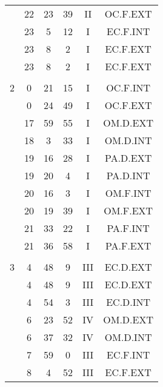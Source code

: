 \documentclass[12pt, a4paper]{article}
\begin{document}
\begin{multicols}{3}
{\begin{tabular}{c c c c c c}
	 	 	 	 & 22 & 23 & 39 & II & OC.F.EXT\\%
	 	 	 	 & 23 & 5 & 12 & I & EC.F.INT\\%
	 	 	 	 & 23 & 8 & 2 & I & EC.F.EXT\\%
	 	 	 	 & 23 & 8 & 2 & I & EC.F.EXT\\%
	 	 	 	 & & & & & \\%
	 	 	 	2 & 0 & 21 & 15 & I & OC.F.INT\\%
	 	 	 	 & 0 & 24 & 49 & I & OC.F.EXT\\%
	 	 	 	 & 17 & 59 & 55 & I & OM.D.EXT\\%
	 	 	 	 & 18 & 3 & 33 & I & OM.D.INT\\%
	 	 	 	 & 19 & 16 & 28 & I & PA.D.EXT\\%
	 	 	 	 & 19 & 20 & 4 & I & PA.D.INT\\%
	 	 	 	 & 20 & 16 & 3 & I & OM.F.INT\\%
	 	 	 	 & 20 & 19 & 39 & I & OM.F.EXT\\%
	 	 	 	 & 21 & 33 & 22 & I & PA.F.INT\\%
	 	 	 	 & 21 & 36 & 58 & I & PA.F.EXT\\%
	 	 	 	 & & & & & \\%
	 	 	 	3 & 4 & 48 & 9 & III & EC.D.EXT\\%
	 	 	 	 & 4 & 48 & 9 & III & EC.D.EXT\\%
	 	 	 	 & 4 & 54 & 3 & III & EC.D.INT\\%
	 	 	 	 & 6 & 23 & 52 & IV & OM.D.EXT\\%
	 	 	 	 & 6 & 37 & 32 & IV & OM.D.INT\\%
	 	 	 	 & 7 & 59 & 0 & III & EC.F.INT\\%
	 	 	 	 & 8 & 4 & 52 & III & EC.F.EXT\\%

\end{tabular}}
\end{multicols}
\end{document}
